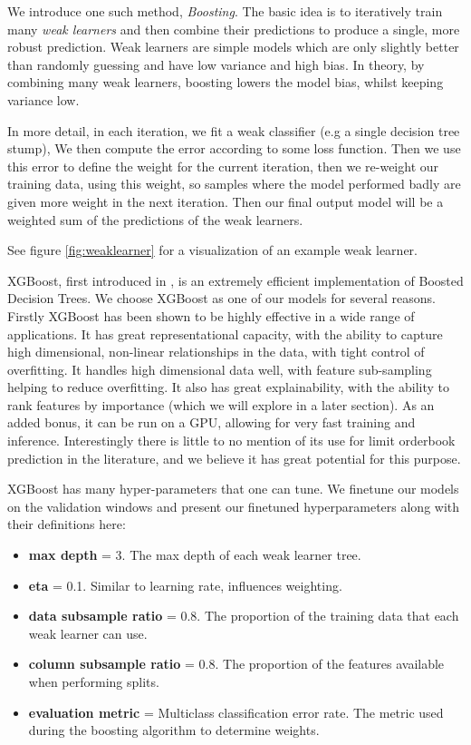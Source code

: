 \documentclass[a4paper, oneside, notitlepage]{book}
\begin{document}
We introduce one such method, \textit{Boosting}. The basic idea is to iteratively train many \textit{weak learners}
and then combine their predictions to produce a single, more robust prediction. Weak learners are simple models
which are only slightly better than randomly guessing and 
have low variance and high bias. In theory, by combining many weak learners, 
boosting lowers the model bias, whilst keeping variance low.

In more detail, in each iteration, we fit a weak classifier (e.g a single decision tree stump),
We then compute the error according to some loss function. Then we use this error to define the weight for the current iteration,
then we re-weight our training data, using this weight, so samples where the model performed badly are given more weight in the next iteration.
Then our final output model will be a weighted sum of the predictions of the weak learners.

See figure \ref{fig:weaklearner} for a visualization of an example weak learner.

XGBoost, first introduced in \cite{XGBOOST2016}, is an extremely efficient implementation of Boosted Decision Trees.
We choose XGBoost as one of our models for several reasons.
Firstly XGBoost has been shown to be highly effective in a wide range of applications.
It has great representational capacity, with the ability to capture high dimensional, non-linear relationships
in the data, with tight control of overfitting.
It handles high dimensional data well, with feature sub-sampling helping to reduce overfitting.
It also has great explainability, with the ability to rank features by importance (which we will explore in a later section).
As an added bonus, it can be run on a GPU, allowing for very fast training and inference.
Interestingly there is little to no mention of its use for limit orderbook prediction in the literature,
and we believe it has great potential for this purpose.

XGBoost has many hyper-parameters that one can tune. We finetune our models on the validation windows and 
present our finetuned hyperparameters along with their definitions here:
 \begin{itemize}
    \item \textbf{max depth} = 3. The max depth of each weak learner tree.
    \item \textbf{eta} = 0.1. Similar to learning rate, influences weighting.
    \item \textbf{data subsample ratio} = 0.8. The proportion of the training data that each weak learner can use.
    \item \textbf{column subsample ratio} = 0.8. The proportion of the features available when performing splits.
    \item \textbf{evaluation metric} = Multiclass classification error rate. The metric used during the boosting algorithm to determine weights.
\end{itemize}
\end{document}
